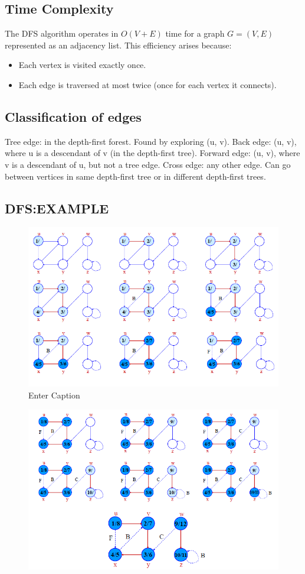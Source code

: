 \subsection{Time Complexity}
The DFS algorithm operates in \(O(V + E)\) time for a graph \(G = (V, E)\) represented as an adjacency list. This efficiency arises because:
\begin{itemize}
    \item Each vertex is visited exactly once.
    \item Each edge is traversed at most twice (once for each vertex it connects).
\end{itemize}

\subsection{Classification of edges}
 Tree edge: in the depth-first forest.
Found by exploring (u, v).
 Back edge: (u, v), where u is a descendant of v (in the
depth-first tree).
 Forward edge: (u, v), where v is a descendant of u, but not
a tree edge.
 Cross edge: any other edge. Can go between vertices in
same depth-first tree or in different depth-first trees.

\subsection{DFS:EXAMPLE}
\begin{figure}[h]
    \centering
    \includegraphics[width=0.75\linewidth]{DFS Example.png}
    \caption{Enter Caption}
    \label{fig:enter-label}
\end{figure}

\begin{figure}[h]
    \centering
    \includegraphics[width=0.75\linewidth]{DFS example 2.png}
    \label{fig:enter-label}
\end{figure}
\newpage
